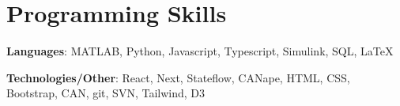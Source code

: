 \documentclass[letterpaper,10pt]{article}
\begin{document}
\section{Programming Skills}
      \textbf{Languages}{: MATLAB, Python, Javascript, Typescript, Simulink, SQL, \LaTeX}
      
      \textbf{Technologies/Other}{: React, Next, Stateflow, CANape, HTML, CSS, Bootstrap, CAN, git, SVN, Tailwind, D3}
\end{document}
